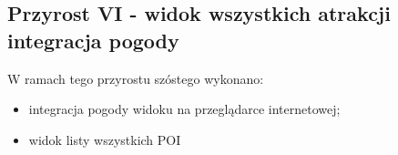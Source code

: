     \subsection{Przyrost VI - widok wszystkich atrakcji integracja pogody}
    \label{sec:przyrost5}

    W ramach tego przyrostu szóstego wykonano:
    \begin{itemize}
        \item integracja pogody widoku na przeglądarce internetowej;
        \item widok listy wszystkich POI
    \end{itemize}

